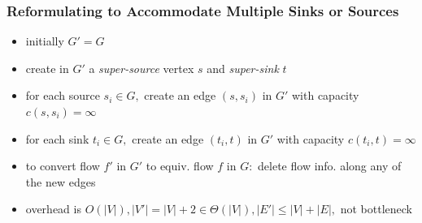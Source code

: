 \documentclass{beamer}
\begin{document}
\begin{frame} \frametitle{Reformulating to Accommodate Multiple Sinks or Sources}
  \begin{itemize}
    \item initially $G'=G$
    \item create in $G'$ a \emph{super-source} vertex $s$ and \emph{super-sink} $t$
    \item for each source $s_i \in G,$ create an edge $(s, s_i)$ in $G'$ with capacity
      $c(s, s_i) = \infty$
    \item for each sink $t_i \in G,$ create an edge $(t_i, t)$ in $G'$ with capacity
      $c(t_i, t) = \infty$
    \item to convert flow $f'$ in $G'$ to equiv. flow $f$ in $G:$ delete flow info.
      along any of the new edges
    \item overhead is $O(|V|), |V'|=|V|+2 \in \Theta(|V|), |E'| \leq |V|+|E|,$ not bottleneck
  \end{itemize}
\end{frame}
\end{document}
